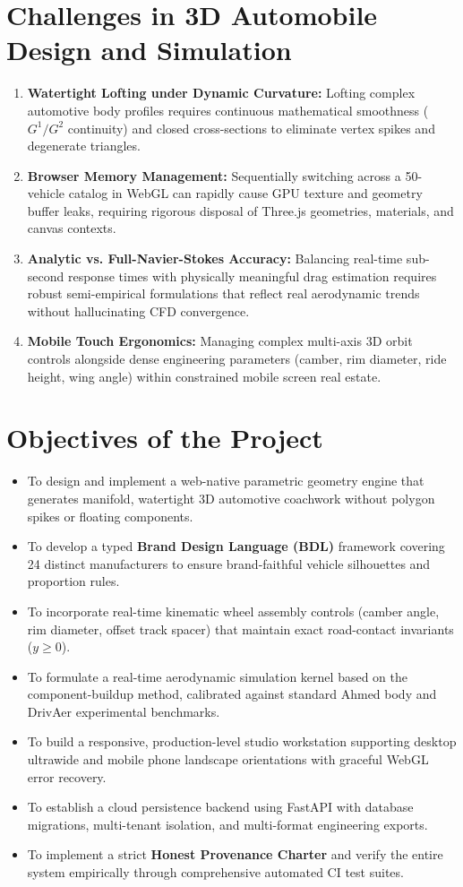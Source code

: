 \documentclass[12pt,a4paper]{report}
\begin{document}
\section{Challenges in 3D Automobile Design and Simulation}
\begin{enumerate}
    \item \textbf{Watertight Lofting under Dynamic Curvature:} Lofting complex automotive body profiles requires continuous mathematical smoothness ($G^1/G^2$ continuity) and closed cross-sections to eliminate vertex spikes and degenerate triangles.
    \item \textbf{Browser Memory Management:} Sequentially switching across a 50-vehicle catalog in WebGL can rapidly cause GPU texture and geometry buffer leaks, requiring rigorous disposal of Three.js geometries, materials, and canvas contexts.
    \item \textbf{Analytic vs. Full-Navier-Stokes Accuracy:} Balancing real-time sub-second response times with physically meaningful drag estimation requires robust semi-empirical formulations that reflect real aerodynamic trends without hallucinating CFD convergence.
    \item \textbf{Mobile Touch Ergonomics:} Managing complex multi-axis 3D orbit controls alongside dense engineering parameters (camber, rim diameter, ride height, wing angle) within constrained mobile screen real estate.
\end{enumerate}

\section{Objectives of the Project}
\begin{itemize}
    \item To design and implement a web-native parametric geometry engine that generates manifold, watertight 3D automotive coachwork without polygon spikes or floating components.
    \item To develop a typed \textbf{Brand Design Language (BDL)} framework covering 24 distinct manufacturers to ensure brand-faithful vehicle silhouettes and proportion rules.
    \item To incorporate real-time kinematic wheel assembly controls (camber angle, rim diameter, offset track spacer) that maintain exact road-contact invariants ($y \ge 0$).
    \item To formulate a real-time aerodynamic simulation kernel based on the component-buildup method, calibrated against standard Ahmed body and DrivAer experimental benchmarks.
    \item To build a responsive, production-level studio workstation supporting desktop ultrawide and mobile phone landscape orientations with graceful WebGL error recovery.
    \item To establish a cloud persistence backend using FastAPI with database migrations, multi-tenant isolation, and multi-format engineering exports.
    \item To implement a strict \textbf{Honest Provenance Charter} and verify the entire system empirically through comprehensive automated CI test suites.
\end{itemize}
\end{document}
